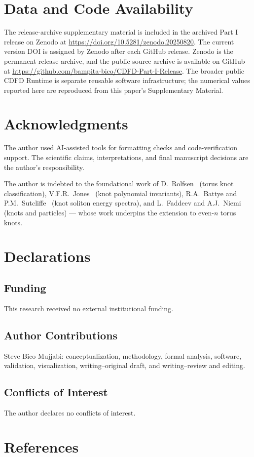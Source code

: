 \documentclass[11pt]{article}
\begin{document}
\section*{Data and Code Availability}

The release-archive supplementary material is included in the archived Part I
release on Zenodo at \url{https://doi.org/10.5281/zenodo.20250820}. The current version DOI is assigned by Zenodo after each GitHub release. Zenodo is the
permanent release archive, and the public source archive is available on GitHub at
\url{https://github.com/bampita-bico/CDFD-Part-I-Release}. The broader public CDFD
Runtime is separate reusable software infrastructure; the numerical values reported
here are reproduced from this paper's Supplementary Material.


\section*{Acknowledgments}
The author used AI-assisted tools for formatting checks and code-verification
support. The scientific claims, interpretations, and final manuscript decisions
are the author's responsibility.

The author is indebted to the foundational work of
D.~Rolfsen~\cite{Rolfsen1976} (torus knot classification),
V.F.R.~Jones~\cite{Jones1985} (knot polynomial invariants),
R.A.~Battye and P.M.~Sutcliffe~\cite{BattyeSutcliffe1998}
(knot soliton energy spectra),
and L.~Faddeev and A.J.~Niemi~\cite{FaddeevNiemi1997} (knots and particles)
--- whose work underpins the extension to even-$n$ torus knots.

\section*{Declarations}

\subsection*{Funding}
This research received no external institutional funding.

\subsection*{Author Contributions}
Steve Bico Mujjabi: conceptualization, methodology, formal analysis, software,
validation, visualization, writing--original draft, and writing--review and
editing.

\subsection*{Conflicts of Interest}
The author declares no conflicts of interest.

\section*{References}


\end{document}

